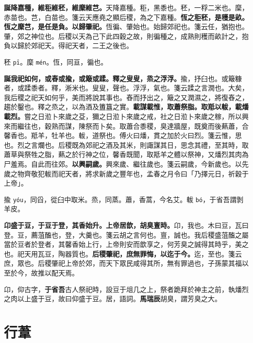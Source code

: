 \textbf{誕降嘉種，維秬維秠，維穈維芑。}{\footnotesize 天降嘉種。秬，黑黍也。秠，一稃二米也。穈，赤苗也。芑，白苗也。箋云天應堯之顯后稷，為之下嘉種。}\textbf{恆之秬秠，是穫是畝。恆之穈芑，是任是負。以歸肇祀。}{\footnotesize 恆徧、肇始也。始歸郊祀也。箋云任，猶抱也。肇，郊之神位也。后稷以天為己下此四穀之故，則徧種之，成熟則穫而畝計之，抱負以歸於郊祀天。得祀天者，二王之後也。}

\begin{quoting}秠 \texttt{pī}。穈 \texttt{mén}。恆，同亘，徧也。\end{quoting}

\textbf{誕我祀如何，或舂或揄，或簸或蹂。釋之叟叟，烝之浮浮。}{\footnotesize 揄，抒臼也。或簸糠者，或蹂黍者。釋，淅米也。叟叟，聲也。浮浮，氣也。箋云蹂之言潤也。大矣，我后稷之祀天如何乎，美而將說其事也。舂而抒出之，簸之又潤濕之，將復舂之，趨於鑿也。釋之烝之，以為酒及簠簋之實。}\textbf{載謀載惟，取蕭祭脂。取羝以軷，載燔載烈。}{\footnotesize 嘗之日涖卜來歲之芟，獮之日涖卜來歲之戒，社之日涖卜來歲之稼，所以興來而繼往也，穀熟而謀，陳祭而卜矣。取蕭合黍稷，臭達牆屋，既奠而後爇蕭，合馨香也。羝羊，牡羊也。軷，道祭也。傅火曰燔，貫之加於火曰烈。箋云惟，思也。烈之言爛也。后稷既為郊祀之酒及其米，則諏謀其日，思念其禮，至其時，取蕭草與祭牲之脂，爇之於行神之位，馨香既聞，取羝羊之體以祭神，又燔烈其肉為尸羞焉。自此而往郊。}\textbf{以興嗣歲。}{\footnotesize 興來歲、繼往歲也。箋云嗣歲，今新歲也。以先歲之物齊敬犯軷而祀天者，將求新歲之豐年也，孟春之月令曰「乃擇元日，祈穀于上帝」。}

\begin{quoting}揄 \texttt{yóu}，同舀，從臼中取米。烝，同蒸。蕭，香蒿，今名艾。軷 \texttt{bó}，于省吾謂剝羊皮。\end{quoting}

\textbf{卬盛于豆，于豆于登，其香始升。上帝居歆，胡臭亶時。}{\footnotesize 卬，我也。木曰豆，瓦曰登。豆，薦菹醢也，登，大羹也。箋云胡之言何也。亶，誠也。我后稷盛菹醢之屬當於豆者於登者，其馨香始上行，上帝則安而歆享之，何芳臭之誠得其時乎，美之也。祀天用瓦豆，陶器質也。}\textbf{后稷肇祀，庶無罪悔，以迄于今。}{\footnotesize 迄，至也。箋云庶，眾也。后稷肇祀上帝於郊，而天下眾民咸得其所，無有罪過也，子孫蒙其福以至於今，故推以配天焉。}

\begin{quoting}卬，仰古字，\textbf{于省吾}古人祭祀時，設豆于俎几之上，祭者跪拜於神主之前，執燔烈之肉以上盛于豆，故曰仰盛于豆。居，語詞。\textbf{馬瑞辰}胡臭，謂芳臭之大。\end{quoting}

\section{行葦}

